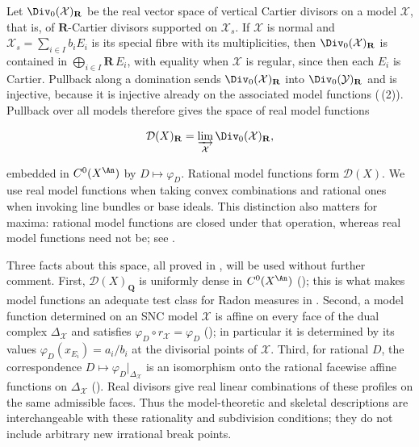 Let $\Div_0(\mathcal X)_{\mathbf R}$ be the real vector space of vertical
Cartier divisors on a model $\mathcal X$, that is, of $\mathbf R$-Cartier
divisors supported on $\mathcal X_s$.  If $\mathcal X$ is normal and
$\mathcal X_s=\sum_{i\in I}b_iE_i$ is its special fibre with its
multiplicities, then $\Div_0(\mathcal X)_{\mathbf R}$ is contained in
$\bigoplus_{i\in I}\mathbf R\,E_i$, with equality when $\mathcal X$ is
regular, since then each $E_i$ is Cartier.  Pullback along a domination
sends $\Div_0(\mathcal X)_{\mathbf R}$ into
$\Div_0(\mathcal Y)_{\mathbf R}$ and is injective, because it is injective
already on the associated model functions
(\,(2)).  Pullback over all models
therefore gives the space of real model functions

\begin{equation}
\label{eq:ch20-model-functions}
 \mathcal D(X)_{\mathbf R}
   =\varinjlim_{\mathcal X}\Div_0(\mathcal X)_{\mathbf R},
\end{equation}

embedded in $C^0(X^{\An})$ by $D\mapsto\varphi_D$.  Rational model
functions form $\mathcal D(X)$.  We use real model functions when taking
convex combinations and rational ones when invoking line bundles or base
ideals.  This distinction also matters for maxima: rational model functions
are closed under that operation, whereas real model functions need not be;
see .

Three facts about this space, all proved in ,
will be used without further comment.  First, $\mathcal D(X)_{\mathbf Q}$
is uniformly dense in $C^0(X^{\An})$
(); this is what makes model
functions an adequate test class for Radon measures in
.  Second, a model function determined on an SNC model
$\mathcal X$ is affine on every face of the dual complex
$\Delta_{\mathcal X}$ and satisfies
$\varphi_D\circ r_{\mathcal X}=\varphi_D$
(); in particular it is determined by its
values $\varphi_D(x_{E_i})=a_i/b_i$ at the divisorial points of
$\mathcal X$.  Third, for rational $D$, the correspondence
$D\mapsto\varphi_D|_{\Delta_{\mathcal X}}$ is an isomorphism onto the
rational facewise affine functions on $\Delta_{\mathcal X}$
().  Real divisors give real
linear combinations of these profiles on the same admissible faces.
Thus the model-theoretic and skeletal descriptions are interchangeable
with these rationality and subdivision conditions; they do not include
arbitrary new irrational break points.

